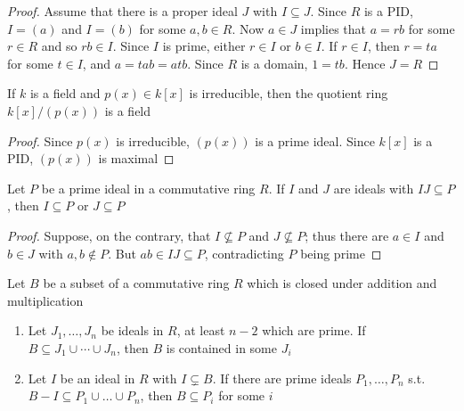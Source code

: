 \documentclass[11pt]{article}
\begin{document}
\begin{proof}
Assume that there is a proper ideal \(J\) with \(I\subseteq J\). Since \(R\) is a
PID, \(I=(a)\) and \(I=(b)\) for some \(a,b\in R\). Now \(a\in J\) implies
that \(a=rb\) for some \(r\in R\) and so \(rb\in I\). Since \(I\) is prime,
either \(r\in I\) or \(b\in I\). If \(r\in I\), then \(r=ta\) for some 
\(t\in I\), and \(a=tab=atb\). Since \(R\) is a domain, \(1=tb\). Hence \(J=R\)
\end{proof}

\begin{corollary}[]
If \(k\) is a field and \(p(x)\in k[x]\) is irreducible, then the quotient ring 
\(k[x]/(p(x))\) is a field
\end{corollary}

\begin{proof}
Since \(p(x)\) is irreducible, \((p(x))\) is a prime ideal. Since \(k[x]\) is
a PID, \((p(x))\) is maximal
\end{proof}

\begin{proposition}[]
Let \(P\) be a prime ideal in a commutative ring \(R\). If \(I\) and \(J\) are ideals
with \(IJ\subseteq P\), then \(I\subseteq P\) or \(J\subseteq P\)
\end{proposition}

\begin{proof}
Suppose, on the contrary, that \(I\not\subseteq P\) and \(J\not\subseteq P\);
thus there are \(a\in I\) and \(b\in J\) with \(a,b\not\in P\). But 
\(ab\in IJ\subseteq P\), contradicting \(P\) being prime
\end{proof}

\begin{proposition}[]
Let \(B\) be a subset of a commutative ring \(R\) which is closed under addition
and multiplication
\begin{enumerate}
\item Let \(J_1,\dots,J_n\) be ideals in \(R\), at least \(n-2\) which are prime.
If \(B\subseteq J_1\cup\cdots\cup J_n\), then \(B\) is contained in some
\(J_i\)
\item Let \(I\) be an ideal in \(R\) with \(I\subsetneq B\). If there are prime
ideals \(P_1,\dots,P_n\) s.t. \(B-I\subseteq P_1\cup\dots\cup P_n\), then 
\(B\subseteq P_i\) for some \(i\)
\end{enumerate}
\end{proposition}
\end{document}
